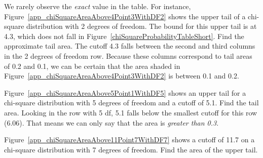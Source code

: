 \begin{examplewrap}
\begin{nexample}{We rarely observe the \emph{exact} value in the table. For instance, Figure~\ref{app_chiSquareAreaAbove4Point3WithDF2} shows the upper tail of a chi-square distribution with 2 degrees of freedom. The bound for this upper tail is at 4.3, which does not fall in Figure~\ref{chiSquareProbabilityTableShort}. Find the approximate tail area.}
The cutoff 4.3 falls between the second and third columns in the 2 degrees of freedom row. Because these columns correspond to tail areas of 0.2 and 0.1, we can be certain that the area shaded in Figure~\ref{app_chiSquareAreaAbove4Point3WithDF2} is between 0.1 and 0.2.
\end{nexample}
\end{examplewrap}

\begin{examplewrap}
\begin{nexample}{Figure~\ref{app_chiSquareAreaAbove5Point1WithDF5} shows an upper tail for a chi-square distribution with 5 degrees of freedom and a cutoff of 5.1. Find the tail area.}
Looking in the row with 5 df, 5.1 falls below the smallest cutoff for this row (6.06). That means we can only say that the area is \emph{greater than 0.3}.
\end{nexample}
\end{examplewrap}

\begin{exercisewrap}
\begin{nexercise}
Figure~\ref{app_chiSquareAreaAbove11Point7WithDF7} shows a cutoff of 11.7 on a chi-square distribution with 7 degrees of freedom. Find the area of the upper tail.\footnotemark
\end{nexercise}
\end{exercisewrap}

%

